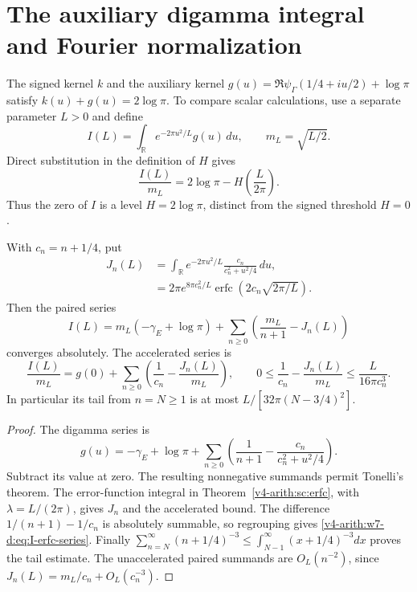 \section{The auxiliary digamma integral and Fourier normalization}

The signed kernel \(k\) and the auxiliary kernel
\(g(u)=\Re\psi_\Gamma(1/4+iu/2)+\log\pi\) satisfy
\(k(u)+g(u)=2\log\pi\). To compare scalar calculations, use a separate
parameter \(L>0\) and define
\[
 I(L)=\int_{\mathbb R}e^{-2\pi u^2/L}g(u)\,du,\qquad m_L=\sqrt{L/2}.
\]
Direct substitution in the definition of \(H\) gives
\begin{equation}
 \frac{I(L)}{m_L}=2\log\pi-H\left(\frac{L}{2\pi}\right).
 \label{v4-arith:w7-d:eq:J-normalised}
\end{equation}
Thus the zero of \(I\) is a level \(H=2\log\pi\), distinct from the
signed threshold \(H=0\).

\begin{proposition}
\label{v4-arith:w7-d:prop:term-by-term}
\label{v4-arith:w7-d:thm:erfc-series}
With \(c_n=n+1/4\), put
\begin{align}
 J_n(L)&=\int_{\mathbb R}e^{-2\pi u^2/L}
                 \frac{c_n}{c_n^2+u^2/4}\,du,
 \label{v4-arith:w7-d:eq:Jn-def}\\
 &=2\pi e^{8\pi c_n^2/L}
       \operatorname{erfc}\left(2c_n\sqrt{2\pi/L}\right).
 \label{v4-arith:w7-d:eq:Jn-closed}
\end{align}
Then the paired series
\begin{equation}
 I(L)=m_L(-\gamma_E+\log\pi)
       +\sum_{n\ge0}\left(\frac{m_L}{n+1}-J_n(L)\right)
 \label{v4-arith:w7-d:eq:I-erfc-series}
\end{equation}
converges absolutely. The accelerated series is
\[
 \frac{I(L)}{m_L}=g(0)+\sum_{n\ge0}
       \left(\frac1{c_n}-\frac{J_n(L)}{m_L}\right),\qquad
 0\le\frac1{c_n}-\frac{J_n(L)}{m_L}
       \le\frac{L}{16\pi c_n^3}.
\]
In particular its tail from \(n=N\ge1\) is at most
\(L/[32\pi(N-3/4)^2]\).
\end{proposition}
\begin{proof}
The digamma series is
\begin{equation}
 g(u)=-\gamma_E+\log\pi+
 \sum_{n\ge0}\left(\frac1{n+1}-\frac{c_n}{c_n^2+u^2/4}\right).
 \label{v4-arith:w7-d:eq:g-hurwitz-recall}
\end{equation}
Subtract its value at zero. The resulting nonnegative summands
permit Tonelli's theorem. The error-function integral in
Theorem~\ref{v4-arith:sc:erfc}, with \(\lambda=L/(2\pi)\), gives
\(J_n\) and the accelerated bound. The difference
\(1/(n+1)-1/c_n\) is absolutely summable, so regrouping gives
\eqref{v4-arith:w7-d:eq:I-erfc-series}.
Finally \(\sum_{n=N}^\infty(n+1/4)^{-3}
\le\int_{N-1}^\infty(x+1/4)^{-3}dx\) proves the tail estimate.
The unaccelerated paired summands are \(O_L(n^{-2})\), since
\(J_n(L)=m_L/c_n+O_L(c_n^{-3})\).
\end{proof}

